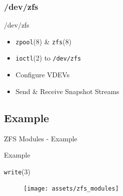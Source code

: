 \subsubsection{/dev/zfs}
\begin{frame}{/dev/zfs}
	\begin{itemize}
		\item \texttt{zpool}(8) \& \texttt{zfs}(8)
		\item \texttt{ioctl}(2) to \texttt{/dev/zfs}
		\item Configure VDEVs
		\item Send \& Receive Snapshot Streams %
	\end{itemize}
\end{frame}



\subsection{Example}
\begin{frame}{ZFS Modules - Example}
	\begin{center}
		\Huge Example
	\end{center}	
\end{frame}

\begin{frame}{\texttt{write}(3)}
\begin{figure}
	\centering
	\texttt{[image: assets/zfs\_modules]}
\end{figure}
\end{frame}

